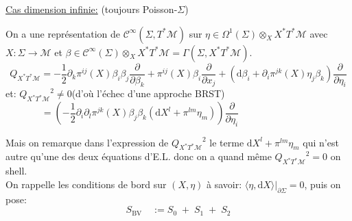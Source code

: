 \documentclass[a4paper,11pt]{article}
\renewcommand{\d}{{\mathrm{d}}}
\newcommand{\dr}[2]{\frac{\partial {#1}}{\partial{#2}}}
\begin{document}
\noindent\underline{Cas dimension infinie:} (toujours Poisson-$\Sigma$)

On a une représentation de $\mathcal{C}^\infty(\Sigma, T^*\mathcal{M})$ sur $\eta \in \Omega^1(\Sigma)\otimes_X X^*T^*\mathcal M$ avec $X:\Sigma\to\mathcal{M}$ et $\beta \in \mathcal{C}^\infty(\Sigma)\otimes_X X^*T^*\mathcal{M} = \Gamma(\Sigma,X^*T^*\mathcal{M})$.
$$Q_{X^*T^*\mathcal M} = -\frac12 \partial_k \pi^{ij}(X) \beta_i\beta_j\dr{}{\beta_k} + \pi^{ij}(X) \beta_i \dr{}{x_j} + (\d \beta_i + \partial_i \pi^{jk}(X)\eta_j \beta_k) \dr{}{\eta_i}$$
et: \quad ${Q_{X^*T^*\mathcal{M}}}^2 \ne 0$\quad\quad (d'où l'échec d'une approche BRST)
$$=\left(-\frac12 \partial_i \partial_l \pi^{jk}(X) \beta_j\beta_k(\d X^l + \pi^{lm} \eta_m)\right)\dr{}{\eta_i} \quad\quad\quad\quad\quad\quad\quad\quad$$

Mais on remarque dans l'expression de ${Q_{X^*T^*\mathcal{M}}}^2$ le terme $\d X^l + \pi^{lm} \eta_m$ qui n'est autre qu'une des deux équations d'E.L. donc on a quand même ${Q_{X^*T^*\mathcal{M}}}^2=0$ on shell.\\
On rappelle les conditions de bord sur $(X,\eta)$ à savoir: $\langle\eta,\d X\rangle\Big|_{\partial\Sigma} = 0$, puis on pose:
$$S_\mathrm{BV} \quad := S_0 \;+\; S_1\;+\;S_2$$
\end{document}
